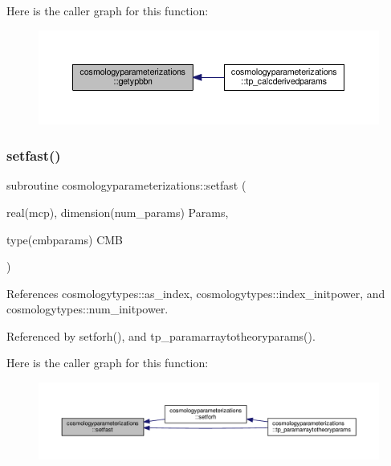 Here is the caller graph for this function\+:
\nopagebreak
\begin{figure}[H]
\begin{center}
\leavevmode
\includegraphics[width=350pt]{namespacecosmologyparameterizations_a211ef353fd86e7f656da5d1ee63e96de_icgraph}
\end{center}
\end{figure}
\mbox{\label{namespacecosmologyparameterizations_a125ded7f9054c23924b78956a86e21af}} 
\subsubsection{\texorpdfstring{setfast()}{setfast()}}
{\footnotesize\ttfamily subroutine cosmologyparameterizations\+::setfast (\begin{DoxyParamCaption}\item[{real(mcp), dimension(num\+\_\+params)}]{Params,  }\item[{type(cmbparams)}]{C\+MB }\end{DoxyParamCaption})\hspace{0.3cm}{\ttfamily [private]}}



References cosmologytypes\+::as\+\_\+index, cosmologytypes\+::index\+\_\+initpower, and cosmologytypes\+::num\+\_\+initpower.



Referenced by setforh(), and tp\+\_\+paramarraytotheoryparams().

Here is the caller graph for this function\+:
\nopagebreak
\begin{figure}[H]
\begin{center}
\leavevmode
\includegraphics[width=350pt]{namespacecosmologyparameterizations_a125ded7f9054c23924b78956a86e21af_icgraph}
\end{center}
\end{figure}
\mbox{\label{namespacecosmologyparameterizations_a4269c5d3027267744bdf4404d32a9db0}} 
